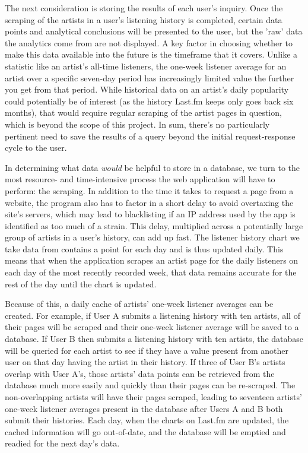 The next consideration is storing the results of each user's inquiry. Once the scraping of the artists in a user's listening history is completed, certain data points and analytical conclusions will be presented to the user, but the 'raw' data the analytics come from are not displayed. A key factor in choosing whether to make this data available into the future is the timeframe that it covers. Unlike a statistic like an artist's all-time listeners, the one-week listener average for an artist over a specific seven-day period has increasingly limited value the further you get from that period. While historical data on an artist's daily popularity could potentially be of interest (as the history Last.fm keeps only goes back six months), that would require regular scraping of the artist pages in question, which is beyond the scope of this project. In sum, there's no particularly pertinent need to save the results of a query beyond the initial request-response cycle to the user.

In determining what data \textit{would} be helpful to store in a database, we turn to the most resource- and time-intensive process the web application will have to perform: the scraping. In addition to the time it takes to request a page from a website, the program also has to factor in a short delay to avoid overtaxing the site's servers, which may lead to blacklisting if an IP address used by the app is identified as too much of a strain. This delay, multiplied across a potentially large group of artists in a user's history, can add up fast. The listener history chart we take data from contains a point for each day and is thus updated daily. This means that when the application scrapes an artist page for the daily listeners on each day of the most recently recorded week, that data remains accurate for the rest of the day until the chart is updated.

Because of this, a daily cache of artists' one-week listener averages can be created. For example, if User A submits a listening history with ten artists, all of their pages will be scraped and their one-week listener average will be saved to a database. If User B then submits a listening history with ten artists, the database will be queried for each artist to see if they have a value present from another user on that day having the artist in their history. If three of User B's artists overlap with User A's, those artists' data points can be retrieved from the database much more easily and quickly than their pages can be re-scraped. The non-overlapping artists will have their pages scraped, leading to seventeen artists' one-week listener averages present in the database after Users A and B both submit their histories. Each day, when the charts on Last.fm are updated, the cached information will go out-of-date, and the database will be emptied and readied for the next day's data.

